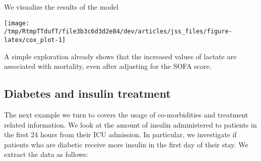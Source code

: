 \documentclass[
]{jss}
\begin{document}
We visualize the results of the model

\begin{CodeChunk}


\begin{center}\texttt{[image: /tmp/RtmpTTdufT/file3b3c6d3d2e84/dev/articles/jss\_files/figure-latex/cox\_plot-1]} \end{center}

\end{CodeChunk}

A simple exploration already shows that the increased values of lactate
are associated with mortality, even after adjusting for the SOFA score.

\hypertarget{diabetes-and-insulin-treatment}{%
\subsection{Diabetes and insulin
treatment}\label{diabetes-and-insulin-treatment}}

The next example we turn to covers the usage of co-morbidities and
treatment related information. We look at the amount of insulin
administered to patients in the first 24 hours from their ICU admission.
In particular, we investigate if patients who are diabetic receive more
insulin in the first day of their stay. We extract the data as follows:
\end{document}

